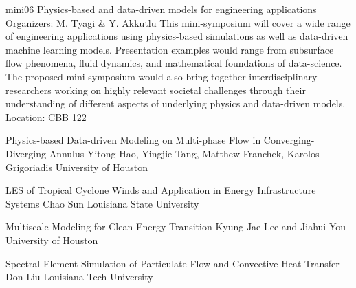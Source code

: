 \mini
{mini06}
{Physics-based and data-driven models for engineering applications}
{Organizers: M. Tyagi \& Y. Akkutlu}
{This mini-symposium will cover a wide range of engineering applications using physics-based simulations as well as data-driven machine learning models. Presentation examples would range from subsurface flow phenomena, fluid dynamics, and mathematical foundations of data-science. The proposed mini symposium would also bring together interdisciplinary researchers working on highly relevant societal challenges through their understanding of different aspects of underlying physics and data-driven models.}
{Location: CBB 122}

\begin{talks}
\item\talk
{Physics-based Data-driven Modeling on Multi-phase Flow in Converging-Diverging Annulus}
{Yitong Hao, Yingjie Tang, Matthew Franchek, Karolos Grigoriadis}
{University of Houston}
\item\talk
{LES of Tropical Cyclone Winds and Application in Energy Infrastructure Systems}
{Chao Sun}
{Louisiana State University}
\item\talk
{Multiscale Modeling for Clean Energy Transition}
{Kyung Jae Lee and Jiahui You}
{University of Houston}
\item\talk
{Spectral Element Simulation of Particulate Flow and Convective Heat Transfer}
{Don Liu}
{Louisiana Tech University}
\end{talks}
\room

